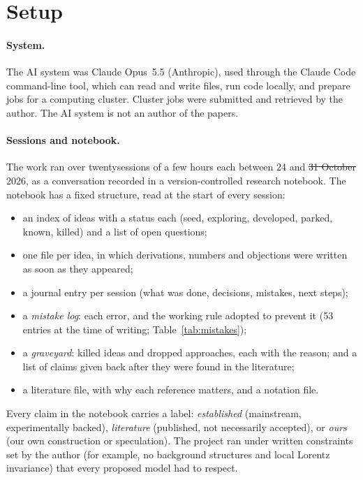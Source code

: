\documentclass[11pt,a4paper]{article}
\makeatletter
\providecommand{\DIFaddtex}[1]{{\protect\color{blue}\uwave{#1}}} %
\providecommand{\DIFdeltex}[1]{{\protect\color{red}\sout{#1}}} %
\providecommand{\DIFaddbegin}{} %
\providecommand{\DIFaddend}{} %
\providecommand{\DIFdelbegin}{} %
\providecommand{\DIFdelend}{} %
\providecommand{\DIFadd}[1]{\texorpdfstring{\DIFaddtex{#1}}{#1}} %
\providecommand{\DIFdel}[1]{\texorpdfstring{\DIFdeltex{#1}}{}} %
\let\sout@orig\sout %
\renewcommand{\sout}[1]{\ifmmode\text{\sout@orig{\ensuremath{#1}}}\else\sout@orig{#1}\fi} %
\makeatother
\begin{document}
\section{Setup}
\paragraph{System.} The AI system was Claude Opus~5.5 (Anthropic), used through the Claude Code command-line tool, which can read and write files, run code locally, and prepare jobs for a computing cluster. Cluster jobs were submitted and retrieved by the author. The AI system is not an author of the papers.

\paragraph{Sessions and notebook.} The work ran over twenty\DIFaddbegin \DIFadd{-one}\DIFaddend  sessions of a few hours each between 24 \DIFaddbegin \DIFadd{October }\DIFaddend and \DIFdelbegin \DIFdel{31 October }\DIFdelend \DIFaddbegin \DIFadd{1 November }\DIFaddend 2026, as a conversation recorded in a version-controlled research notebook. The notebook has a fixed structure, read at the start of every session:
\begin{itemize}[itemsep=1pt]
\item an index of ideas with a status each (seed, exploring, developed, parked, known, killed) and a list of open questions;
\item one file per idea, in which derivations, numbers and objections were written as soon as they appeared;
\item a journal entry per session (what was done, decisions, mistakes, next steps);
\item a \emph{mistake log}: each error, and the working rule adopted to prevent it (53 entries at the time of writing; Table~\ref{tab:mistakes});
\item a \emph{graveyard}: killed ideas and dropped approaches, each with the reason; and a list of claims given back after they were found in the literature;
\item a literature file, with why each reference matters, and a notation file.
\end{itemize}
Every claim in the notebook carries a label: \emph{established} (mainstream, experimentally backed), \emph{literature} (published, not necessarily accepted), or \emph{ours} (our own construction or speculation). The project ran under written constraints set by the author (for example, no background structures and local Lorentz invariance) that every proposed model had to respect.
\end{document}
